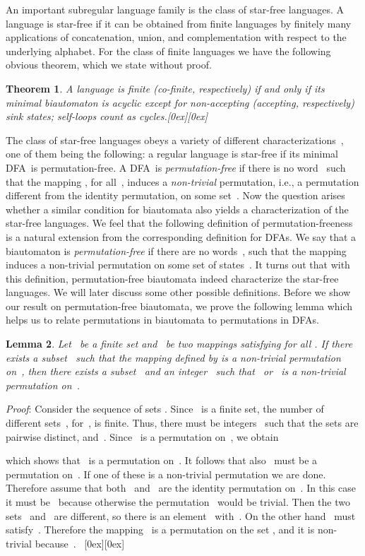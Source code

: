 \documentclass[submission]{eptcs}
\newcommand{\resp}{respectively}
\newcommand{\dfa}{\textrm{DFA}}
\newcommand*{\qed}{\raisebox{0.5ex}[0ex][0ex]{\framebox[1ex][l]{}}}
\newtheorem{theorem}{Theorem}
\newtheorem{lemma}[theorem]{Lemma}
\newenvironment{proof}{\par\noindent
  {\rmfamily\itshape\mdseries Proof\/}:\hspace{\labelsep}\ignorespaces}{\mbox{}\nolinebreak\hfill~{\qed}
  \medbreak
}
\begin{document}
An important subregular language family is the class of star-free
languages. A language is star-free if it can be obtained from finite
languages by finitely many applications of concatenation, union, and
complementation with respect to the underlying alphabet.  For the
class of finite languages we have the following obvious theorem, which
we state without proof.

\begin{theorem}
  A language is finite (co-finite, \resp) if and only if its minimal
  biautomaton is acyclic except for non-accepting (accepting, \resp)
  sink states; self-loops count as cycles.\hfill\qed
\end{theorem}

The class of star-free languages obeys a variety of different
characterizations~\cite{McNaPa71}, one of them being the following: a
regular language is star-free if its minimal \dfa\ is
permutation-free.  A \dfa\  is
\emph{permutation-free} if there is no word~ such that
the mapping , for all~, induces a
\emph{non-trivial} permutation, i.e., a permutation different from the
identity permutation, on some set~.
Now the question arises whether a similar condition for biautomata
also yields a characterization of the star-free languages.  We feel
that the following definition of permutation-freeness is a natural
extension from the corresponding definition for \dfa s.  We say that a
biautomaton  is
\emph{permutation-free} if there are no words~, such
that the mapping  induces a non-trivial
permutation on some set of states~.  It turns out that
with this definition, permutation-free biautomata indeed characterize
the star-free languages.  We will later discuss some other possible
definitions.  Before we show our result on permutation-free
biautomata, we prove the following lemma which helps us to relate
permutations in biautomata to permutations in \dfa s.

\begin{lemma}\label{lem:permutation-lemma}
  Let~ be a finite set and~ be two
  mappings satisfying  for all
  .  If there exists a subset~ such that the
  mapping  defined by  is
  a non-trivial permutation on~, then there exists a
  subset~ and an integer~ such that~
  or~ is a non-trivial permutation on~.
\end{lemma}

\begin{proof}
  Consider the sequence of sets .  Since~ is a finite set, the number of
  different sets~, for~, is finite.  Thus, there
  must be integers~ such that the sets  are pairwise distinct,
  and~.  Since~ is a permutation on~, we obtain

which shows that~ is a permutation on~.  It follows that
  also~ must be a permutation on~.  If one of these is a
  non-trivial permutation we are done.  
Therefore assume that both~ and~ are the identity
  permutation on~.  In this case it must be~ because
  otherwise the permutation~ would be trivial.  Then
  the two sets~ and~ are different, so there is an
  element~ with~.  On the other hand~ must
  satisfy~.  Therefore the mapping~ is a
  permutation on the set
  , and it is
  non-trivial because~.
\end{proof}
\end{document}
